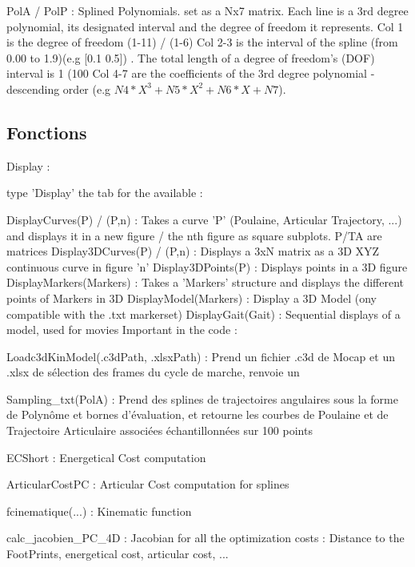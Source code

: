 \documentclass{article}
\begin{document}
PolA / PolP : Splined Polynomials. set as a Nx7 matrix. Each line is a 3rd degree polynomial, its designated interval and the degree of freedom it represents. 
Col 1 is the degree of freedom (1-11) / (1-6)
Col 2-3 is the interval of the spline (from 0.00 to 1.9)(e.g [0.1 0.5]) . The total length of a degree of freedom's (DOF) interval is 1 (100%
Col 4-7 are the coefficients of the 3rd degree polynomial - descending order (e.g $N4*X^3 + N5*X^2 + N6*X + N7$).

\subsection{Fonctions}

Display :

type 'Display' the tab for the available :

DisplayCurves(P) / (P,n) : Takes a curve 'P' (Poulaine, Articular Trajectory, ...) and displays it in a new figure / the nth figure as square subplots. P/TA are matrices
Display3DCurves(P) / (P,n) : Displays a 3xN matrix as a 3D XYZ continuous curve in figure 'n'
Display3DPoints(P) : Displays points in a 3D figure
DisplayMarkers(Markers) : Takes a 'Markers' structure and displays the different points of Markers in 3D
DisplayModel(Markers) : Display a 3D Model (ony compatible with the .txt markerset)
DisplayGait(Gait) : Sequential displays of a model, used for movies
Important in the code :

Loadc3dKinModel(.c3dPath, .xlsxPath) : Prend un fichier .c3d de Mocap et un .xlsx de sélection des frames du cycle de marche, renvoie un

Sampling\_txt(PolA) : Prend des splines de trajectoires angulaires sous la forme de Polynôme et bornes d'évaluation, et retourne les courbes de Poulaine et de Trajectoire Articulaire associées échantillonnées sur 100 points

ECShort : Energetical Cost computation

ArticularCostPC : Articular Cost computation for splines

fcinematique(...) : Kinematic function

calc\_jacobien\_PC\_4D : Jacobian for all the optimization costs : Distance to the FootPrints, energetical cost, articular cost, ...
\end{document}
